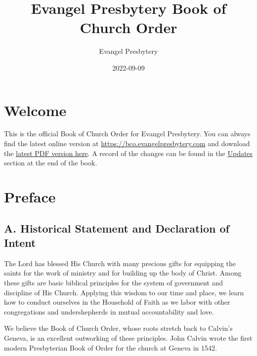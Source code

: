 \documentclass[
]{book}
\title{Evangel Presbytery Book of Church Order}
\author{Evangel Presbytery}
\date{2022-09-09}
\begin{document}
\maketitle

\mainmatter
{}

{
\hypersetup{linkcolor=}
\setcounter{tocdepth}{1}
\tableofcontents
}
\hypertarget{welcome}{%
\chapter*{Welcome}\label{welcome}}

This is the official Book of Church Order for Evangel Presbytery. You can always find the latest online version at \url{https://bco.evangelpresbytery.com} and download the \href{https://bco.evangelpresbytery.com/evangel-presbytery-bco.pdf}{latest PDF version here}. A record of the changes can be found in the \href{https://bco.evangelpresbytery.com/updates.html}{Updates} section at the end of the book.

\clearpage
\setcounter{page}{1}

\hypertarget{preface}{%
\chapter*{Preface}\label{preface}}

\protect\hypertarget{front-matter-preface}{\href{}{}}

\hypertarget{a.-historical-statement-and-declaration-of-intent}{%
\section*{A. Historical Statement and Declaration of Intent}\label{a.-historical-statement-and-declaration-of-intent}}

The Lord has blessed His Church with many precious gifts for equipping the saints for the work of ministry and for building up the body of Christ. Among these gifts are basic biblical principles for the system of government and discipline of His Church. Applying this wisdom to our time and place, we learn how to conduct ourselves in the Household of Faith as we labor with other congregations and undershepherds in mutual accountability and love.

We believe the Book of Church Order, whose roots stretch back to Calvin's Geneva, is an excellent outworking of these principles. John Calvin wrote the first modern Presbyterian Book of Order for the church at Geneva in 1542.
\end{document}
